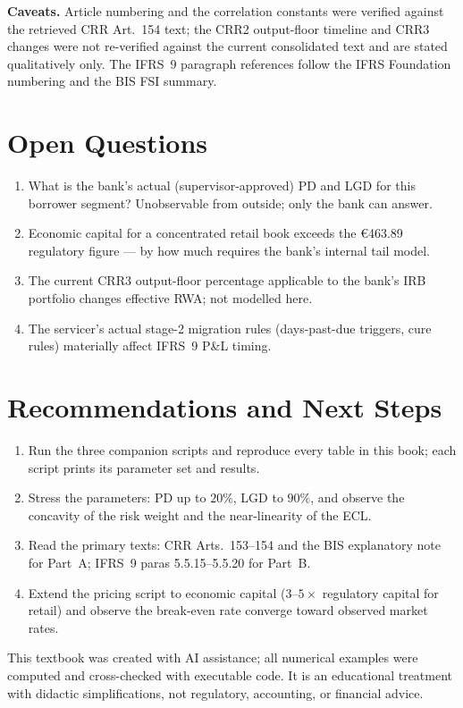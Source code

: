 \documentclass[11pt,a4paper]{report}
\renewcommand{\EUR}[1]{\euro#1}
\theoremstyle{definition}
\theoremstyle{plain}
\begin{document}
\textbf{Caveats.} Article numbering and the correlation constants were
verified against the retrieved CRR Art.~154 text; the CRR2 output-floor
timeline and CRR3 changes were not re-verified against the current
consolidated text and are stated qualitatively only. The IFRS~9
paragraph references follow the IFRS Foundation numbering and the BIS
FSI summary.

\section*{Open Questions}

\begin{enumerate}
\item What is the bank's actual (supervisor-approved) PD and LGD for
      this borrower segment? Unobservable from outside; only the bank
      can answer.
\item Economic capital for a concentrated retail book exceeds the
      \EUR{463.89} regulatory figure --- by how much requires the
      bank's internal tail model.
\item The current CRR3 output-floor percentage applicable to the
      bank's IRB portfolio changes effective RWA; not modelled here.
\item The servicer's actual stage-2 migration rules (days-past-due
      triggers, cure rules) materially affect IFRS~9 P\&L timing.
\end{enumerate}

\section*{Recommendations and Next Steps}

\begin{enumerate}
\item Run the three companion scripts and reproduce every table in
      this book; each script prints its parameter set and results.
\item Stress the parameters: PD up to $20\%$, LGD to $90\%$, and
      observe the concavity of the risk weight and the near-linearity
      of the ECL.
\item Read the primary texts: CRR Arts.~153--154 and the BIS
      explanatory note for Part~A; IFRS~9 paras 5.5.15--5.5.20 for
      Part~B.
\item Extend the pricing script to economic capital ($3$--$5\times$
      regulatory capital for retail) and observe the break-even rate
      converge toward observed market rates.
\end{enumerate}

\vfill
\begin{center}
\color{accentgrey}\small
This textbook was created with AI assistance; all numerical examples
were computed and cross-checked with executable code. It is an
educational treatment with didactic simplifications, not regulatory,
accounting, or financial advice.
\end{center}
\end{document}
